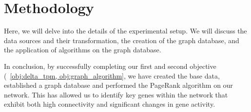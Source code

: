 \section{Methodology} \label{sec:methodology}
Here, we will delve into the details of the experimental setup.
We will discuss the data sources and their transformation, the creation of the graph database,
and the application of algorithms on the graph database.










In conclusion, by successfully completing our first and second objective (~\cref{obj:delta_tpm, obj:graph_algorithm},
we have created the base data, established a graph database and performed the PageRank algorithm on our network.
This has allowed us to identify key genes within the network that exhibit both high connectivity
and significant changes in gene activity.
